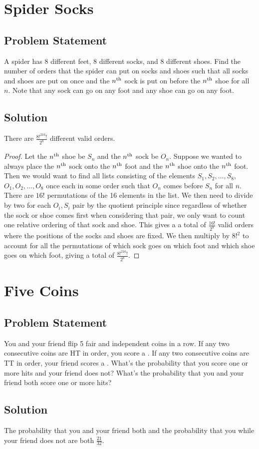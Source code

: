 \documentclass[12pt]{article}
\newcommand{\ts}[1]{\textsuperscript{#1}}
\newcommand{\ProblemStatement}[1]{
\subsection*{Problem Statement}
#1
\subsection*{Solution}
}
\begin{document}
\section{Spider Socks}
\ProblemStatement{
A spider has 8 different feet, 8 different socks, and 8 different shoes. Find the number of orders that the spider can put on socks and shoes such that all socks and shoes are put on once and the $n\ts{th}$ sock is put on before the $n\ts{th}$ shoe for all $n$. Note that any sock can go on any foot and any shoe can go on any foot.}
There are $\frac{8!^216!}{2^8}$ different valid orders. 

\begin{proof}
Let the $n\ts{th}$ shoe be $S_n$ and the $n\ts{th}$ sock be $O_n$. Suppose we wanted to always place the $n\ts{th}$ sock onto the $n\ts{th}$ foot and the $n\ts{th}$ shoe onto the $n\ts{th}$ foot. Then we would want to find all lists consisting of the elements $S_1, S_2, \dots, S_8$, $O_1, O_2, \dots, O_8$ once each in some order such that $O_n$ comes before $S_n$ for all $n$. There are $16!$ permutations of the 16 elements in the list. We then need to divide by two for each $O_i, S_i$ pair by the quotient principle since regardless of whether the sock or shoe comes first when considering that pair, we only want to count one relative ordering of that sock and shoe. This gives a a total of $\frac{16!}{2^8}$ valid orders where the positions of the socks and shoes are fixed. We then multiply by $8!^2$ to account for all the permutations of which sock goes on which foot and which shoe goes on which foot, giving a total of $\frac{8!^216!}{2^8}$.
\end{proof}


\section{Five Coins}
\ProblemStatement{
You and your friend flip 5 fair and independent coins in a row. If any two consecutive coins are HT in order, you score a \say{hit}. If any two consecutive coins are TT in order, your friend scores a \say{hit}. What's the probability that you score one or more hits and your friend does not? What's the probability that you and your friend both score one or more hits?
}

The probability that you and your friend both  and the probability that you  while your friend does not are both $\frac{21}{32}$.
\end{document}
